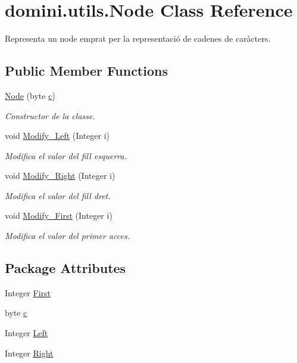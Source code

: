 \hypertarget{classdomini_1_1utils_1_1Node}{}\section{domini.\+utils.\+Node Class Reference}
\label{classdomini_1_1utils_1_1Node}


Representa un node emprat per la representació de cadenes de caràcters.  


\subsection*{Public Member Functions}
\begin{DoxyCompactItemize}
\item 
\hyperlink{classdomini_1_1utils_1_1Node_ae337ba617322158f0ac240c900350278}{Node} (byte \hyperlink{classdomini_1_1utils_1_1Node_a2fbef2557db813ae02a2d52032eaa6e1}{c})
\begin{DoxyCompactList}\small\item\em Constructor de la classe. \end{DoxyCompactList}\item 
void \hyperlink{classdomini_1_1utils_1_1Node_a5a1cbd1e7f1fd78b42050f563520a709}{Modify\+\_\+\+Left} (Integer i)
\begin{DoxyCompactList}\small\item\em Modifica el valor del fill esquerra. \end{DoxyCompactList}\item 
void \hyperlink{classdomini_1_1utils_1_1Node_a58d22f8330339b6d807cdef44d0eddf6}{Modify\+\_\+\+Right} (Integer i)
\begin{DoxyCompactList}\small\item\em Modifica el valor del fill dret. \end{DoxyCompactList}\item 
void \hyperlink{classdomini_1_1utils_1_1Node_a3fe2e958308c90d24607a4e191680089}{Modify\+\_\+\+First} (Integer i)
\begin{DoxyCompactList}\small\item\em Modifica el valor del primer acces. \end{DoxyCompactList}\end{DoxyCompactItemize}
\subsection*{Package Attributes}
\begin{DoxyCompactItemize}
\item 
Integer \hyperlink{classdomini_1_1utils_1_1Node_a42db9f259f129c72cab2052a0f8ba42a}{First}
\item 
byte \hyperlink{classdomini_1_1utils_1_1Node_a2fbef2557db813ae02a2d52032eaa6e1}{c}
\item 
Integer \hyperlink{classdomini_1_1utils_1_1Node_a2f1d911cf52953b29d42e5e020b82dbf}{Left}
\item 
Integer \hyperlink{classdomini_1_1utils_1_1Node_a73c97e595bad2513ee0a06ee4620236a}{Right}
\end{DoxyCompactItemize}


